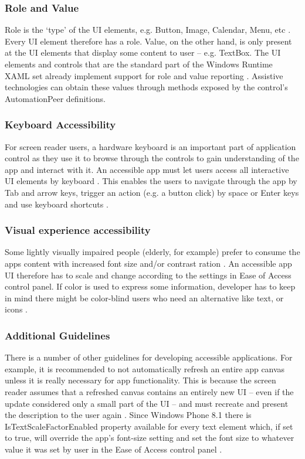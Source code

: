 \subsubsection{Role and Value}
Role is the ‘type’ of the UI elements, e.g. Button, Image, Calendar, Menu, etc \cite{wp8UIelementsAcc}. Every UI element therefore has a role. Value, on the other hand, is only present at the UI elements that display some content to user – e.g. TextBox. The UI elements and controls that are the standard part of the Windows Runtime XAML set already implement support for role and value reporting \cite{wp8UIelementsAcc}. Assistive technologies can obtain these values through methods exposed by the control's AutomationPeer definitions.


\subsubsection{Keyboard Accessibility}
For screen reader users, a hardware keyboard is an important part of application control as they use it to browse through the controls to gain understanding of the app and interact with it. An accessible app must let users access all interactive UI elements by keyboard \cite{wp8guide}. This enables the users to navigate through the app by Tab and arrow keys, trigger an action (e.g. a button click) by space or Enter keys and use keyboard shortcuts \cite{wp8guide}.

\subsubsection{Visual experience accessibility}
Some lightly visually impaired people (elderly, for example) prefer to consume the apps content with increased font size and/or contrast ration \cite{wp8guide}. An accessible app UI therefore has to scale and change according to the settings in Ease of Access control panel. If color is used to express some information, developer has to keep in mind there might be color-blind users who need an alternative like text, or icons \cite{wp8guide}.

\subsubsection{Additional Guidelines}
There is a number of other guidelines for developing accessible applications. For example, it is recommended to not automatically refresh an entire app canvas unless it is really necessary for app functionality. This is because the screen reader assumes that a refreshed canvas contains an entirely new UI – even if the update considered only a small part of the UI – and must recreate and present the description to the user again \cite{wp8guide}.
Since Windows Phone 8.1 there is IsTextScaleFactorEnabled property available for every text element which, if set to true, will override the app's font-size setting and set the font size to whatever value it was set by user in the Ease of Access control panel \cite{wp8guide}.
